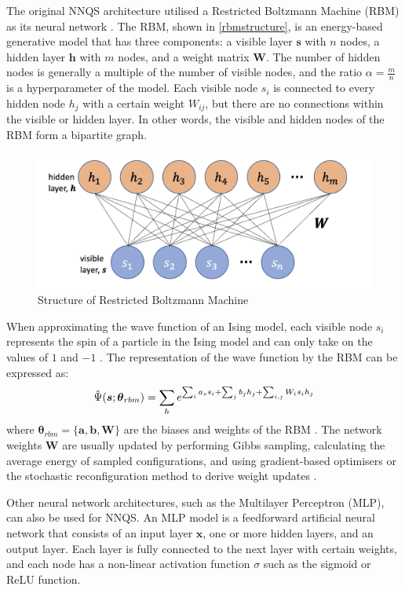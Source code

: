 The original NNQS architecture utilised a Restricted Boltzmann Machine (RBM) as its neural network \cite{b20}. The RBM, shown in \autoref{rbmstructure}, is an energy-based generative model that has three components: a visible layer $\boldsymbol{s}$ with $n$ nodes, a hidden layer $\boldsymbol{h}$ with $m$ nodes, and a weight matrix $\mathbf{W}$. The number of hidden nodes is generally a multiple of the number of visible nodes, and the ratio $\alpha = \frac{m}{n}$ is a hyperparameter of the model. Each visible node $s_i$ is connected to every hidden node $h_j$ with a certain weight $W_{ij}$, but there are no connections within the visible or hidden layer. In other words, the visible and hidden nodes of the RBM form a bipartite graph.
\begin{figure}[h!]
    \centering
    \includegraphics[width=0.9\linewidth]{images/rbm_diagram.png}
    \caption{Structure of Restricted Boltzmann Machine}
    \label{rbmstructure}
\end{figure}

When approximating the wave function of an Ising model, each visible node $s_i$ represents the spin of a particle in the Ising model and can only take on the values of $1$ and $-1$ \cite{b20}. The representation of the wave function by the RBM can be expressed as:
\begin{equation}
    \Hat{\Psi}(\boldsymbol{s} ; \boldsymbol{\theta}_{rbm}) = \sum_{h} e^{\sum_i a_s s_i + \sum_j b_j h_j + \sum_{i,j}W_i s_i h_j} 
\end{equation}
where  $\boldsymbol{\theta}_{rbm} = \{\boldsymbol{a}, \boldsymbol{b}, \boldsymbol{W}\}$ are the biases and weights of the RBM \cite{b20}. The network weights $\mathbf{W}$ are usually updated by performing Gibbs sampling, calculating the average energy of sampled configurations, and using gradient-based optimisers or the stochastic reconfiguration method to derive weight updates \cite{b25}.

Other neural network architectures, such as the Multilayer Perceptron (MLP), can also be used for NNQS. An MLP model is a feedforward artificial neural network that consists of an input layer $\boldsymbol{x}$, one or more hidden layers, and an output layer. Each layer is fully connected to the next layer with certain weights, and each node has a non-linear activation function $\sigma$ such as the sigmoid or ReLU function. 

